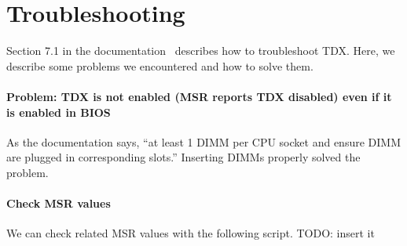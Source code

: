 \documentclass[letterpaper,twocolumn,10pt]{article}
\newcommand{\myparagraph}{\paragraph}
\begin{document}
\section{Troubleshooting}
Section 7.1 in the documentation~\cite{linux-stacks-for-intel-tdx-2023ww01} describes how to troubleshoot TDX.
Here, we describe some problems we encountered and how to solve them.

\myparagraph{Problem: TDX is not enabled (MSR reports TDX disabled) even if it is enabled in BIOS}
As the documentation says, ``at least 1 DIMM per CPU socket and ensure DIMM are plugged in corresponding slots.''
Inserting DIMMs properly solved the problem.

\myparagraph{Check MSR values}
We can check related MSR values with the following script.
TODO: insert it

\end{document}

